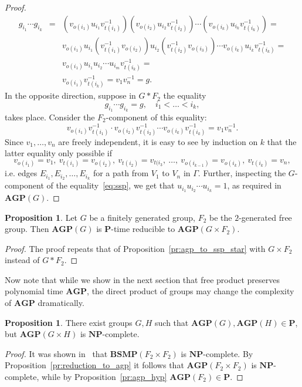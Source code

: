 \documentclass[10pt]{amsart}
\theoremstyle{definition}
\newtheorem{proposition}[theorem]{Proposition}
\def\P{{\mathbf{P}}}
\def\NP{{\mathbf{NP}}}
\def\BSMP{{\mathbf{BSMP}}}
\def\AGP{{\mathbf{AGP}}}
\begin{document}
\begin{proof}
\begin{eqnarray*}
g_{i_1}\cdots g_{i_k}&=&(v_{o(i_1)}u_{i_1}v_{t(i_1)}^{-1})
(v_{o(i_2)}u_{i_2}v_{t(i_2)}^{-1})\cdots (v_{o(i_k)}u_{i_k}v_{t(i_k)}^{-1})=\\
&&v_{o(i_1)}u_{i_1}(v_{t(i_1)}^{-1}
v_{o(i_2)})u_{i_2}(v_{t(i_2)}^{-1}v_{o(i_3)})\cdots v_{o(i_k)}u_{i_k}v_{t(i_k)}^{-1}=\\
&&v_{o(i_1)}u_{i_1}u_{i_2}\cdots u_{i_m}v_{t(i_k)}^{-1}=\\
&&v_{o(i_1)}v_{t(i_k)}^{-1}=v_{1}v_{n}^{-1}=g.
\end{eqnarray*}
In the opposite direction, suppose in $G\ast F_2$ the equality
\begin{equation}\label{eq:ssp}
g_{i_1}\cdots g_{i_k}=g,\quad i_1<\ldots<i_k,
\end{equation}
takes place. Consider the $F_2$-component of this equality:
$$
v_{o(i_1)}v_{t(i_1)}^{-1}\cdot v_{o(i_2)}v_{t(i_2)}^{-1}\cdots v_{o(i_k)}v_{t(i_k)}^{-1}=v_1v_n^{-1}.
$$
Since $v_1,\ldots, v_n$ are freely independent, it is easy to see by induction on $k$ that the latter equality only possible if
$$
v_{o(i_1)}=v_1,\ v_{t(i_1)}=v_{o(i_2)},\ v_{t(i_2)}=v_{t(i_3},\ \ldots,\ v_{o(i_{k-1})}=v_{o(i_k)},\ v_{t(i_k)}=v_n,
$$
i.e. edges $E_{i_1}, E_{i_2},\ldots, E_{i_k}$ for a path from $V_1$ to $V_n$ in $\Gamma$. Further, inspecting the $G$-component of the equality~\eqref{eq:ssp}, we get that $u_{i_1}u_{i_2}\cdots u_{i_k}=1$, as required in $\AGP(G)$.
\end{proof}

\begin{proposition}\label{pr:agp_to_ssp_cross}
Let $G$ be a finitely generated group, $F_2$ be the $2$-generated free group. Then $\AGP(G)$ is $\P$-time reducible to $\AGP(G\times F_2)$.
\end{proposition}
\begin{proof}
The proof repeats that of Proposition~\ref{pr:agp_to_ssp_star} with $G\times F_2$ instead of $G\ast F_2$.
\end{proof}


Now note that while we show in the next section that free product preserves polynomial time $\AGP$, the direct product of groups may change the complexity of $\AGP$ dramatically.
\begin{proposition}\label{pr:agp_cross}
There exist groups $G,H$ such that $\AGP(G),\AGP(H)\in\P$, but $\AGP(G\times H)$ is $\NP$-complete.
\end{proposition}
\begin{proof}
It was shown in~\cite[Theorem 7.4]{Miasnikov-Nikolaev-Ushakov:2014a} that $\BSMP(F_2\times F_2)$ is $\NP$-complete. By Proposition~\ref{pr:reduction_to_agp} it follows that $\AGP(F_2\times F_2)$ is $\NP$-complete, while by Proposition~\ref{pr:agp_hyp} $\AGP(F_2)\in\P$.
\end{proof}
\end{document}
